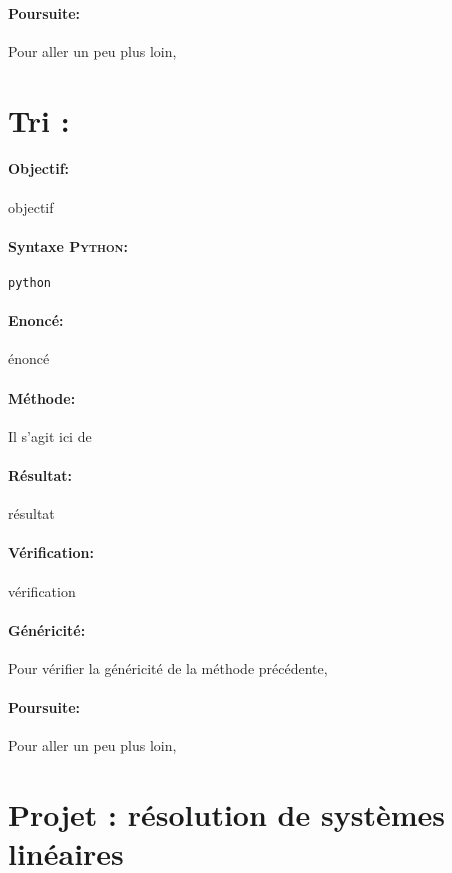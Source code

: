 \documentclass[11pt,a4paper,colorlinks,breaklinks]{article}
\def\python{\textsc{Python}}
\begin{document}
\paragraph{Poursuite:} Pour aller un peu plus loin,


\newpage
\section{Tri : }\label{maths:tri}
\paragraph{Objectif:} objectif

\paragraph{Syntaxe \python:} \texttt{python}

\begin{framed}
\paragraph{Enoncé:} énoncé
\end{framed}

\paragraph{Méthode:} Il s'agit ici de 

\paragraph{Résultat:} résultat

\paragraph{Vérification:} vérification

\paragraph{Généricité:} Pour vérifier la généricité de la méthode précédente,

\paragraph{Poursuite:} Pour aller un peu plus loin,


\newpage
\section{Projet : résolution de systèmes linéaires}\label{maths:projet}

\end{document}
